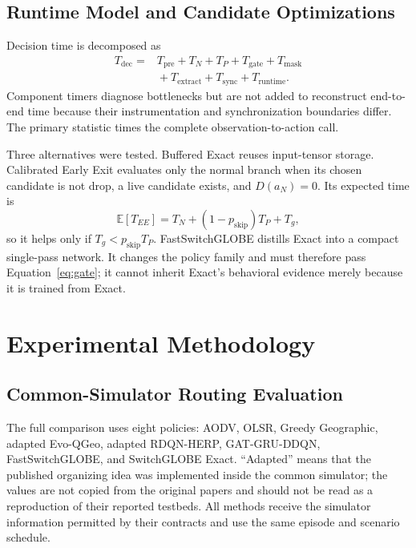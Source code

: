 \documentclass{ieeeaccess}
\newcommand{\SG}{SwitchGLOBE}
\newcommand{\FastSG}{FastSwitchGLOBE}
\newcommand{\E}{\mathbb{E}}
\begin{document}
\subsection{Runtime Model and Candidate Optimizations}

Decision time is decomposed as
\begin{equation}
\begin{aligned}
T_{\mathrm{dec}}={}&T_{\mathrm{pre}}+T_N+T_P+T_{\mathrm{gate}}+T_{\mathrm{mask}}\\
&{}+T_{\mathrm{extract}}+T_{\mathrm{sync}}+T_{\mathrm{runtime}}.
\end{aligned}
\end{equation}
Component timers diagnose bottlenecks but are not added to reconstruct end-to-end time because their instrumentation and synchronization boundaries differ. The primary statistic times the complete observation-to-action call.

Three alternatives were tested. Buffered Exact reuses input-tensor storage. Calibrated Early Exit evaluates only the normal branch when its chosen candidate is not drop, a live candidate exists, and $D(a_N)=0$. Its expected time is
\begin{equation}
\E[T_{EE}]=T_N+(1-p_{\mathrm{skip}})T_P+T_g,
\end{equation}
so it helps only if $T_g<p_{\mathrm{skip}}T_P$. \FastSG{} distills Exact into a compact single-pass network. It changes the policy family and must therefore pass Equation~\eqref{eq:gate}; it cannot inherit Exact's behavioral evidence merely because it is trained from Exact.

\section{Experimental Methodology}

\subsection{Common-Simulator Routing Evaluation}

The full comparison uses eight policies: AODV, OLSR, Greedy Geographic, adapted Evo-QGeo, adapted RDQN-HERP, GAT-GRU-DDQN, \FastSG{}, and \SG{} Exact. ``Adapted'' means that the published organizing idea was implemented inside the common simulator; the values are not copied from the original papers and should not be read as a reproduction of their reported testbeds. All methods receive the simulator information permitted by their contracts and use the same episode and scenario schedule.
\end{document}
